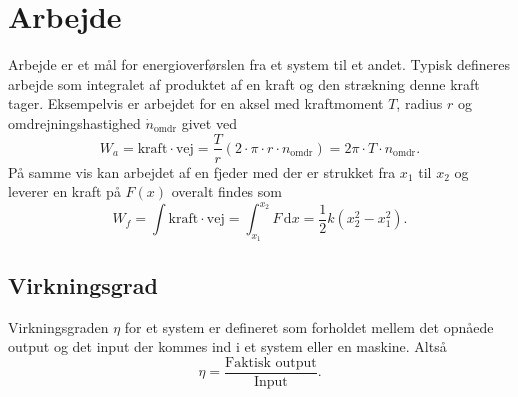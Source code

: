 \section{Arbejde}
Arbejde er et mål for energioverførslen fra et system til et andet. Typisk defineres arbejde som integralet af produktet af en kraft og den strækning denne kraft tager. Eksempelvis er arbejdet for en aksel med kraftmoment $T$, radius $r$ og omdrejningshastighed $\dot{n}_{\mathrm{omdr}}$ givet ved
\[ 
W_a = \mathrm{kraft} \cdot \mathrm{vej} = \frac{T}{r} \left( 2 \cdot \pi \cdot r \cdot n_{\mathrm{omdr}} \right) = 2\pi \cdot T \cdot n_{\mathrm{omdr}}
.\]
På samme vis kan arbejdet af en fjeder med der er strukket fra $x_{1}$ til $x_2$ og leverer en kraft på $F(x)$ overalt findes som
\[ 
W_f = \int \mathrm{kraft} \cdot \mathrm{vej} = \int_{x_1}^{x_2} F \, \mathrm{d}x = \frac{1}{2} k \left( x_2^2 - x_1^2 \right)
.\]

\subsection{Virkningsgrad}
Virkningsgraden $\eta$ for et system er defineret som forholdet mellem det opnåede output og det input der kommes ind i et system eller en maskine. Altså
\[ 
\eta = \frac{\text{Faktisk output}}{\mathrm{Input}}
.\]

